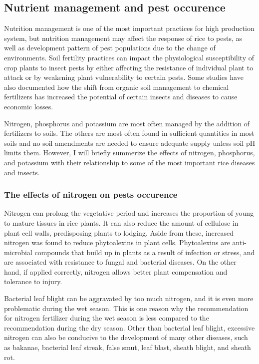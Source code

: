 \documentclass[12pt, oneside]{report}
\begin{document}
\subsection*{Nutrient management and pest occurence}

Nutrition management is one of the most important practices for high production system, but nutrition management may affect the response of rice to pests, as well as development pattern of pest populations due to the change of environments. Soil fertility practices can impact the physiological susceptibility of crop plants to insect pests by either affecting the resistance of individual plant to attack or by weakening plant vulnerability to certain pests. Some studies have also documented how the shift from organic soil management to chemical fertilizers has increased the potential of certain insects and diseases to cause economic losses.

Nitrogen, phosphorus and potassium are most often managed by the addition of fertilizers to soils. The others are most often found in sufficient quantities in most soils and no soil amendments are needed to ensure adequate supply unless soil pH limits them. However, I will briefly summerize the effects of nitrogen, phosphorus, and potassium with their relationship to some of the most important rice diseases and insects.

\subsubsection{The effects of nitrogen on pests occurence}

Nitrogen can prolong the vegetative period and increases the proportion of young to mature tissues in rice plants. It can also reduce the amount of cellulose in plant cell walls, predisposing plants to lodging. Aside from these, increased nitrogen was found to reduce phytoalexins in plant cells. Phytoalexins are anti-microbial compounds that build up in plants as a result of infection or stress, and are associated with resistance to fungal and bacterial diseases. On the other hand, if applied correctly, nitrogen allows better plant compensation and tolerance to injury. 

Bacterial leaf blight can be aggravated by too much nitrogen, and it is even more problematic during the wet season. This is one reason why the recommendation for nitrogen fertilizer during the wet season is less compared to the recommendation during the dry season. Other than bacterial leaf blight, excessive nitrogen can also be conducive to the development of many other diseases, such as bakanae, bacterial leaf streak, false smut, leaf blast, sheath blight, and sheath rot.
\end{document}
